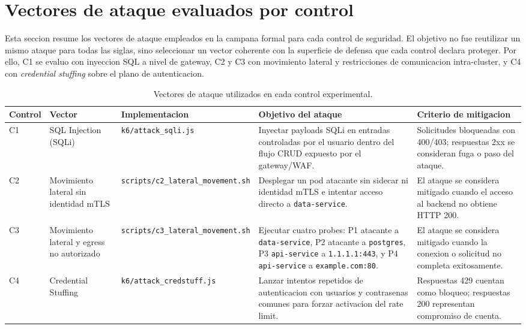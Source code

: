 \section{Vectores de ataque evaluados por control}
\label{sec:vectores-ataque-20260521}

Esta seccion resume los vectores de ataque empleados en la campana formal para cada control de seguridad. El objetivo no fue reutilizar un mismo ataque para todas las siglas, sino seleccionar un vector coherente con la superficie de defensa que cada control declara proteger. Por ello, C1 se evaluo con inyeccion SQL a nivel de gateway, C2 y C3 con movimiento lateral y restricciones de comunicacion intra-cluster, y C4 con \textit{credential stuffing} sobre el plano de autenticacion.

\begin{table}[htbp]
\centering
\small
\caption{Vectores de ataque utilizados en cada control experimental.}
\label{tab:vectores-ataque-por-control}
\begin{tabular}{p{}p{}p{}p{}p{}}
\toprule
Control & Vector & Implementacion & Objetivo del ataque & Criterio de mitigacion \\
\midrule
C1 & SQL Injection (SQLi) & \texttt{k6/attack\_sqli.js} & Inyectar payloads SQLi en entradas controladas por el usuario dentro del flujo CRUD expuesto por el gateway/WAF. & Solicitudes bloqueadas con 400/403; respuestas 2xx se consideran fuga o paso del ataque. \\

C2 & Movimiento lateral sin identidad mTLS & \texttt{scripts/c2\_lateral\_movement.sh} & Desplegar un pod atacante sin sidecar ni identidad mTLS e intentar acceso directo a \texttt{data-service}. & El ataque se considera mitigado cuando el acceso al backend no obtiene HTTP 200. \\

C3 & Movimiento lateral y egress no autorizado & \texttt{scripts/c3\_lateral\_movement.sh} & Ejecutar cuatro probes: P1 atacante a \texttt{data-service}, P2 atacante a \texttt{postgres}, P3 \texttt{api-service} a \texttt{1.1.1.1:443}, y P4 \texttt{api-service} a \texttt{example.com:80}. & El ataque se considera mitigado cuando la conexion o solicitud no completa exitosamente. \\

C4 & Credential Stuffing & \texttt{k6/attack\_credstuff.js} & Lanzar intentos repetidos de autenticacion con usuarios y contrasenas comunes para forzar activacion del rate limit. & Respuestas 429 cuentan como bloqueo; respuestas 200 representan compromiso de cuenta. \\
\bottomrule
\end{tabular}
\end{table}


